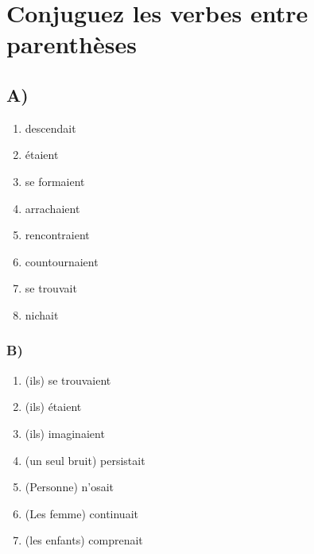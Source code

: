 \section{Conjuguez les verbes entre parenthèses}

\subsection{A)}

\begin{enumerate}
    \item descendait
    \item étaient
    \item se formaient
    \item arrachaient
    \item rencontraient
    \item countournaient
    \item se trouvait
    \item nichait
\end{enumerate}

\subsubsection{B)}

\begin{enumerate}
    \item (ils) se trouvaient
    \item (ils) étaient
    \item (ils) imaginaient
    \item (un seul bruit) persistait
    \item (Personne) n'osait
    \item (Les femme) continuait
    \item (les enfants) comprenait
\end{enumerate}